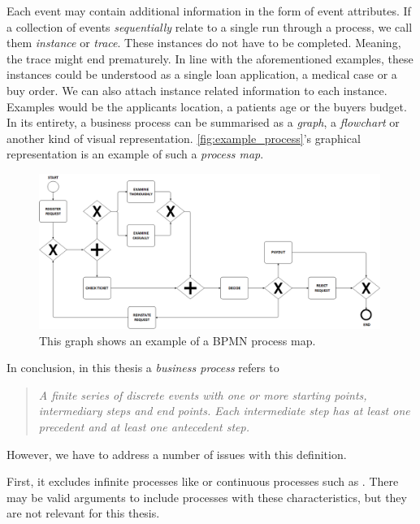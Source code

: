 \documentclass[./../../paper.tex]{subfiles}
\begin{document}
Each \gls{event} may contain additional information in the form of event attributes. If a collection of events \emph{sequentially} relate to a single run through a process, we call them \emph{\gls{instance}} or \emph{trace}. These instances do not have to be completed. Meaning, the trace might end prematurely. In line with the aforementioned examples, these \glspl{instance} could be understood as a single loan application, a medical case or a buy order. We can also attach \gls{instance} related information to each instance. Examples would be the applicants location, a patients age or the buyers budget. In its entirety, a business process can be summarised as a \emph{graph}, a \emph{flowchart} or another kind of visual representation. \autoref{fig:example_process}'s graphical representation is an example of such a \emph{process map}\autocite{vanderaalst_ProcessMiningManifesto_2012}. 


\begin{figure}[htb]
    \centering
    \includegraphics[width=0.99\textwidth]{figures/example_process.png}
    \caption{This graph shows an example of a \gls{BPMN} process map.}
    \label{fig:example_process}
\end{figure}



In conclusion, in this thesis a \emph{business process} refers to \begin{quote}
    \emph{A finite series of discrete events with one or more starting points, intermediary steps and end points. Each intermediate step has at least one precedent and at least one antecedent step.}
\end{quote}
However, we have to address a number of issues with this definition.

First, it excludes infinite processes like  or continuous processes such as . There may be valid arguments to include processes with these characteristics, but they are not relevant for this thesis.
\end{document}
